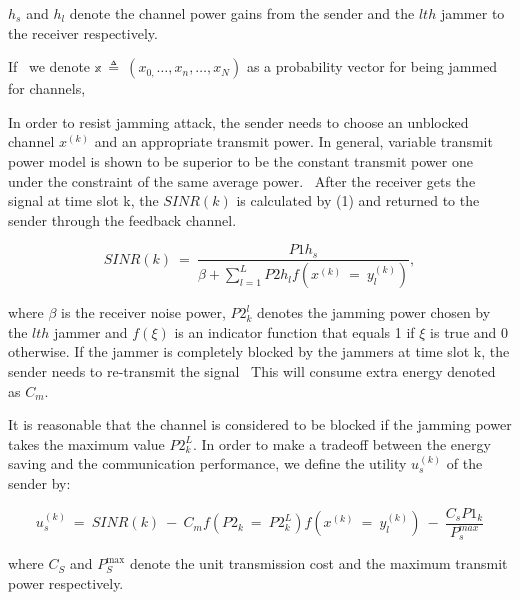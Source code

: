 \documentclass[letterpaper%
, twoside%
, 12pt%
,thesepararticles%
, english%
,creativecommons,hyperref, withAlgo2e%
]{thETS}
\begin{document}
 $\displaystyle h_{s}$ and $\displaystyle h_{l}$ denote the channel power gains from the sender and the $\displaystyle lth$ jammer to the receiver respectively. 

If \ we denote $\displaystyle \mathbb{x} \ \triangleq \ ( x_{0,} \dotsc ,x_{n} ,\dotsc ,x_{N})$ as a probability vector for being jammed for channels,


In order to resist jamming attack, the sender needs to choose an unblocked channel $\displaystyle x^{( k)}$ and an appropriate transmit power. In general, variable transmit power model is shown to be superior to be the constant transmit power one under the constraint of the same average power. \ After the receiver gets the signal at time slot k, the $\displaystyle SINR( k)$ is calculated by (1) and returned to the sender through the feedback channel. 
 
\begin{equation}
SINR( k) \ =\ \frac{P1h_{s}}{\beta +\sum _{l=1}^{L} P2h_{l} f\left( x^{( k)} \ =\ y_{l}^{( k)}\right)} ,
\end{equation}
 
 where $\displaystyle \beta $ is the receiver noise power, $\displaystyle P2_{k}^{l}$ denotes the jamming power chosen by the $\displaystyle lth$ jammer and $\displaystyle f( \xi )$ is an indicator function that equals 1 if $\displaystyle \xi $ is true and 0 otherwise. If the jammer is completely blocked by the jammers at time slot k, the sender needs to re-transmit the signal \ This will consume extra energy denoted as $\displaystyle C_{m} .$

It is reasonable that the channel is considered to be blocked if the jamming power takes the maximum value $\displaystyle P2_{k}^{L} .$ In order to make a tradeoff between the energy saving and the communication performance, we define the utility $\displaystyle u_{s}^{( k)}$ of the sender by: 
 
\begin{equation}
u_{s}^{( k)} \ =\ SINR( k) \ -\ C_{m} f\left( P2_{k} \ =\ P2_{k}^{L}\right) f\left( x^{( k)} \ =\ y_{l}^{( k)}\right) \ -\ \frac{C_{s} P1_{k}}{P_{s}^{max}}
\end{equation}

where $\displaystyle C_{S}$ and $\displaystyle P_{S}^{\max}$ denote the unit transmission cost and the maximum transmit power respectively. 
\end{document}

